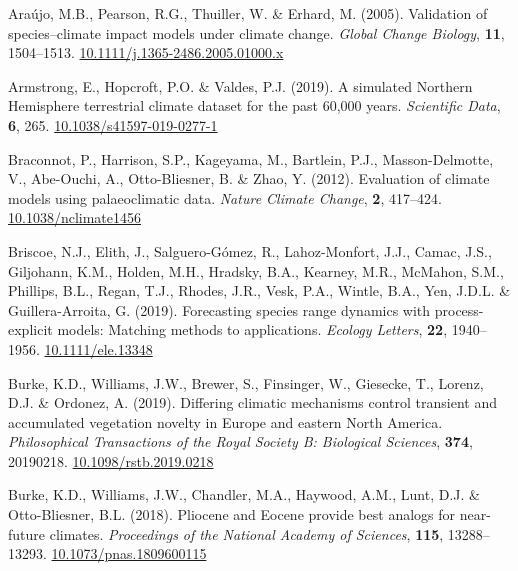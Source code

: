 \documentclass[11pt,]{article}
\newlength{\cslhangindent}
\newenvironment{CSLReferences}[2] %
 {%
  \setlength{\parindent}{0pt}
  \ifodd #1 \everypar{\setlength{\hangindent}{\cslhangindent}}\ignorespaces\fi
  \ifnum #2 > 0
  \setlength{\parskip}{#2\baselineskip}
  \fi
 }%
 {}
\begin{document}
\noindent

\hypertarget{refs}{}
\begin{CSLReferences}{1}{0}
\leavevmode{}%
Araújo, M.B., Pearson, R.G., Thuiller, W. \& Erhard, M. (2005).
Validation of species--climate impact models under climate change.
\emph{Global Change Biology}, \textbf{11}, 1504--1513.
\href{https://doi.org/10.1111/j.1365-2486.2005.01000.x}{10.1111/j.1365-2486.2005.01000.x}

\leavevmode{}%
Armstrong, E., Hopcroft, P.O. \& Valdes, P.J. (2019). A simulated
{Northern} {Hemisphere} terrestrial climate dataset for the past 60,000
years. \emph{Scientific Data}, \textbf{6}, 265.
\href{https://doi.org/10.1038/s41597-019-0277-1}{10.1038/s41597-019-0277-1}

\leavevmode{}%
Braconnot, P., Harrison, S.P., Kageyama, M., Bartlein, P.J.,
Masson-Delmotte, V., Abe-Ouchi, A., Otto-Bliesner, B. \& Zhao, Y.
(2012). Evaluation of climate models using palaeoclimatic data.
\emph{Nature Climate Change}, \textbf{2}, 417--424.
\href{https://doi.org/10.1038/nclimate1456}{10.1038/nclimate1456}

\leavevmode{}%
Briscoe, N.J., Elith, J., Salguero-Gómez, R., Lahoz-Monfort, J.J.,
Camac, J.S., Giljohann, K.M., Holden, M.H., Hradsky, B.A., Kearney,
M.R., McMahon, S.M., Phillips, B.L., Regan, T.J., Rhodes, J.R., Vesk,
P.A., Wintle, B.A., Yen, J.D.L. \& Guillera-Arroita, G. (2019).
Forecasting species range dynamics with process-explicit models:
Matching methods to applications. \emph{Ecology Letters}, \textbf{22},
1940--1956. \href{https://doi.org/10.1111/ele.13348}{10.1111/ele.13348}

\leavevmode{}%
Burke, K.D., Williams, J.W., Brewer, S., Finsinger, W., Giesecke, T.,
Lorenz, D.J. \& Ordonez, A. (2019). Differing climatic mechanisms
control transient and accumulated vegetation novelty in {Europe} and
eastern {North} {America}. \emph{Philosophical Transactions of the Royal
Society B: Biological Sciences}, \textbf{374}, 20190218.
\href{https://doi.org/10.1098/rstb.2019.0218}{10.1098/rstb.2019.0218}

\leavevmode{}%
Burke, K.D., Williams, J.W., Chandler, M.A., Haywood, A.M., Lunt, D.J.
\& Otto-Bliesner, B.L. (2018). Pliocene and {Eocene} provide best
analogs for near-future climates. \emph{Proceedings of the National
Academy of Sciences}, \textbf{115}, 13288--13293.
\href{https://doi.org/10.1073/pnas.1809600115}{10.1073/pnas.1809600115}


\end{CSLReferences}
\end{document}
